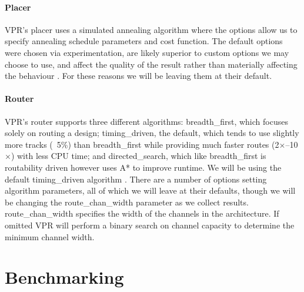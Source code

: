\documentclass[12pt,final,oneside]{dwThesis} %
\begin{document}
\subsubsection{Placer}
\ac{VPR}'s placer uses a simulated annealing algorithm where the options allow us to specify annealing schedule parameters and cost function. The default options were chosen via experimentation, are likely superior to custom options we may choose to use, and affect the quality of the result rather than materially affecting the behaviour \cite{VPRManual, VPRBook}. For these reasons we will be leaving them at their default.
\subsubsection{Router}
\ac{VPR}'s router supports three different algorithms: breadth\_first, which focuses solely on routing a design; timing\_driven, the default, which tends to use slightly more tracks (~5\%) than breadth\_first while providing much faster routes (2$\times$--10$\times$) with less CPU time; and directed\_search, which like breadth\_first is routability driven however uses A* to improve runtime. We will be using the default timing\_driven algorithm .
There are a number of options setting algorithm parameters, all of which we will leave at their defaults, though we will be changing the route\_chan\_width parameter as we collect results. route\_chan\_width specifies the width of the channels in the architecture. If omitted \ac{VPR} will perform a binary search on channel capacity to determine the minimum channel width.

\chapter{Benchmarking}
\end{document}

